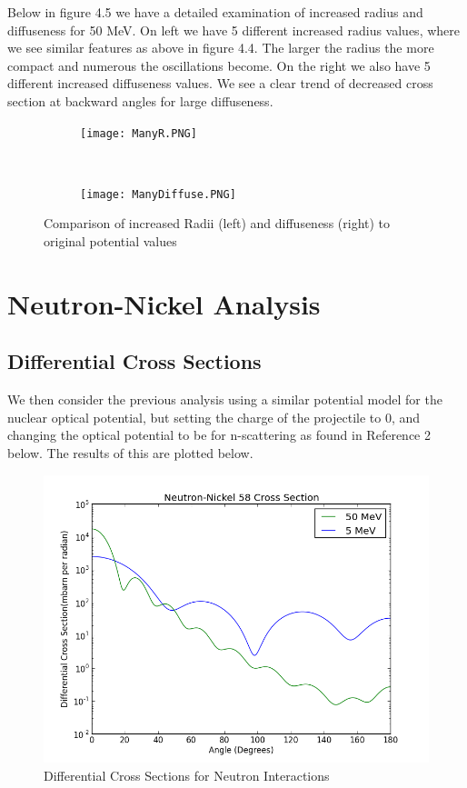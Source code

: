 \documentclass[paper=a4, fontsize=11pt]{scrartcl} %
\numberwithin{equation}{section} %
\numberwithin{figure}{section} %
\numberwithin{table}{section} %
\begin{document}
Below in figure 4.5 we have a detailed examination of increased radius and diffuseness for 50 MeV.  On left we have 5 different increased radius values, where we see similar features as above in figure 4.4.  The larger the radius the more compact and numerous the oscillations become.  On the right we also have 5 different increased diffuseness values.  We see a clear trend of decreased cross section at backward angles for large diffuseness.  

 \begin{figure}[hbt]
        \centering
        \begin{subfigure}[b!]{0.5\textwidth}
                \texttt{[image: ManyR.PNG]}
        \end{subfigure}%
        ~ %
\quad
        \begin{subfigure}[b!]{0.5\textwidth}
                \texttt{[image: ManyDiffuse.PNG]}
        \end{subfigure}

        \caption{Comparison of increased Radii (left) and diffuseness (right) to original potential values}
\end{figure}

\section{Neutron-Nickel Analysis}
\subsection{Differential Cross Sections}
We then consider the previous analysis using a similar potential model for the nuclear optical potential, but setting the charge of the projectile to 0, and changing the optical potential to be for n-scattering as found in Reference 2 below. The results of this are plotted below.\\


 \begin{figure}[hbt]
        \centering
	\includegraphics[width=.6\textwidth]{CrossSectionsNEns}
        \caption{Differential Cross Sections for Neutron Interactions}
\end{figure}
\end{document}
